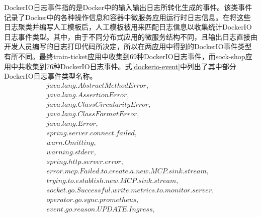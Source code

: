 DockerIO日志事件指的是Docker中的输入输出日志所转化生成的事件。该类事件记录了Docker\cite{boettiger2015introduction}中的各种操作信息和容器中微服务应用运行时日志信息。在将这些日志聚类并编写人工模板后，人工模板被用来匹配日志信息以收集统计DockerIO日志事件类型。其中，由于不同分布式应用的微服务结构不同，且输出日志直接由开发人员编写的日志打印代码所决定，所以在两应用中得到的DockerIO事件类型有所不同。最终train-ticket应用中收集到69种DockerIO日志事件，而sock-shop应用中共收集到76种DockerIO日志事件。式\ref{dockerio-event}中列出了其中部分DockerIO日志事件类型名称。
\begin{equation}
    \begin{array}{l}
        java.lang.AbstractMethodError,\\
        java.lang.AssertionError,\\
        java.lang.ClassCircularityError,\\
        java.lang.ClassFormatError,\\
        java.lang.Error,\\
        spring.server.connect.failed,\\
        warn.Omitting,\\
        warning.stderr,\\
        spring.http.server.error,\\
        error.mcp.Failed.to.create.a.new.MCP.sink.stream,\\
        trying.to.establish.new.MCP.sink.stream,\\
        socket.go.Successful.write.metrics.to.monitor.server,\\
        operator.go.sync.prometheus,\\
        event.go.reason.UPDATE.Ingress,\\
    \end{array}
    \label{dockerio-event}
\end{equation}

